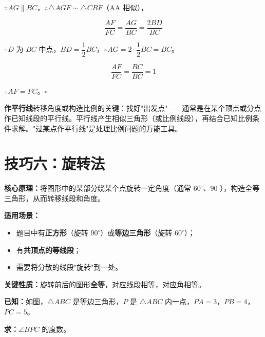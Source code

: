 \documentclass[12pt, a4paper]{ctexart}
\begin{document}
\(\because AG \parallel BC\)，\(\therefore \triangle AGF \sim \triangle CBF\)（AA 相似），

\[\frac{AF}{FC} = \frac{AG}{BC} = \frac{2BD}{BC}\]

\(\because D\) 为 \(BC\) 中点，\(BD = \dfrac{1}{2}BC\)，\(\therefore AG = 2 \cdot \dfrac{1}{2}BC = BC\)。

\[\frac{AF}{FC} = \frac{BC}{BC} = 1\]

\(\therefore AF = FC\)。\hfill\(\square\)

\begin{tipbox}[方法总结]
\textbf{作平行线}转移角度或构造比例的关键：找好"出发点"——通常是在某个顶点或分点作已知线段的平行线。平行线产生相似三角形（或比例线段），再结合已知比例条件求解。"过某点作平行线"是处理比例问题的万能工具。
\end{tipbox}

\section*{\textcolor{mainblue}{技巧六：旋转法}}

\begin{knowledgebox}[什么是旋转法？]
\textbf{核心原理：}将图形中的某部分绕某个点旋转一定角度（通常 \(60^\circ\)、\(90^\circ\)），构造全等三角形，从而转移线段和角度。

\medskip
\noindent\textbf{适用场景：}
\begin{itemize}[leftmargin=1.5em]
  \item 题目中有\textbf{正方形}（旋转 \(90^\circ\)）或\textbf{等边三角形}（旋转 \(60^\circ\)）；
  \item 有\textbf{共顶点的等线段}；
  \item 需要将分散的线段"旋转"到一处。
\end{itemize}

\medskip
\noindent\textbf{关键性质：}旋转前后的图形\textbf{全等}，对应线段相等，对应角相等。
\end{knowledgebox}

\begin{examplebox}[【例题 6-1】等边三角形中的旋转]
\textbf{已知：}如图，\(\triangle ABC\) 是等边三角形，\(P\) 是 \(\triangle ABC\) 内一点，\(PA = 3\)，\(PB = 4\)，\(PC = 5\)。

\textbf{求：}\(\angle BPC\) 的度数。
\end{examplebox}
\end{document}
